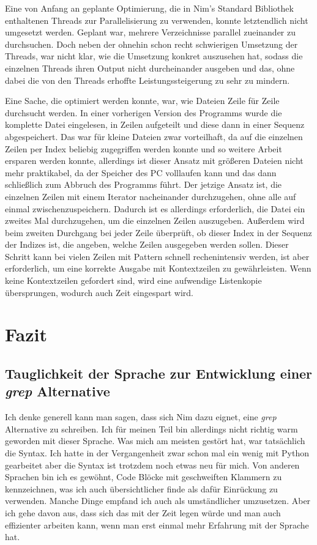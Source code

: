 \documentclass[11pt]{report}
\begin{document}
Eine von Anfang an geplante Optimierung, die in Nim's Standard Bibliothek enthaltenen Threads zur Parallelisierung zu verwenden, konnte letztendlich nicht umgesetzt werden. Geplant war, mehrere Verzeichnisse parallel zueinander zu durchsuchen. Doch neben der ohnehin schon recht schwierigen Umsetzung der Threads, war nicht klar, wie die Umsetzung konkret auszusehen hat, sodass die einzelnen Threads ihren Output nicht durcheinander ausgeben und das, ohne dabei die von den Threads erhoffte Leistungssteigerung zu sehr zu mindern.

Eine Sache, die optimiert werden konnte, war, wie Dateien Zeile für Zeile durchsucht werden. In einer vorherigen Version des Programms wurde die komplette Datei eingelesen, in Zeilen aufgeteilt und diese dann in einer Sequenz abgespeichert. Das war für kleine Dateien zwar vorteilhaft, da auf die einzelnen Zeilen per Index beliebig zugegriffen werden konnte und so weitere Arbeit ersparen werden konnte, allerdings ist dieser Ansatz mit größeren Dateien nicht mehr praktikabel, da der Speicher des PC volllaufen kann und das dann schließlich zum Abbruch des Programms führt. Der jetzige Ansatz ist, die einzelnen Zeilen mit einem Iterator nacheinander durchzugehen, ohne alle auf einmal zwischenzuspeichern. Dadurch ist es allerdings erforderlich, die Datei ein zweites Mal durchzugehen, um die einzelnen Zeilen auszugeben. Außerdem wird beim zweiten Durchgang bei jeder Zeile überprüft, ob dieser Index in der Sequenz der Indizes ist, die angeben, welche Zeilen ausgegeben werden sollen. Dieser Schritt kann bei vielen Zeilen mit Pattern schnell rechenintensiv werden, ist aber erforderlich, um eine korrekte Ausgabe mit Kontextzeilen zu gewährleisten.
Wenn keine Kontextzeilen gefordert sind, wird eine aufwendige Listenkopie übersprungen, wodurch auch Zeit eingespart wird.



\chapter{Fazit}
\section{Tauglichkeit der Sprache zur Entwicklung einer \emph{grep} Alternative}
Ich denke generell kann man sagen, dass sich Nim dazu eignet, eine \emph{grep} Alternative zu schreiben. Ich für meinen Teil bin allerdings nicht richtig warm geworden mit dieser Sprache. Was mich am meisten gestört hat, war tatsächlich die Syntax. Ich hatte in der Vergangenheit zwar schon mal ein wenig mit Python gearbeitet aber die Syntax ist trotzdem noch etwas neu für mich. Von anderen Sprachen bin ich es gewöhnt, Code Blöcke mit geschweiften Klammern zu kennzeichnen, was ich auch übersichtlicher finde als dafür Einrückung zu verwenden. Manche Dinge empfand ich auch als umständlicher umzusetzen.
\newline
Aber ich gehe davon aus, dass sich das mit der Zeit legen würde und man auch effizienter arbeiten kann, wenn man erst einmal mehr Erfahrung mit der Sprache hat.
\end{document}
